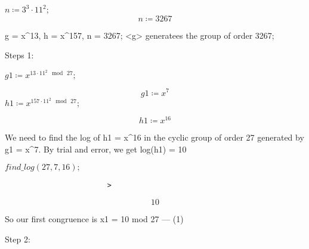 \documentclass[11pt,a4paper,fleqn]{article}
\begin{document}
\begin{enumerate}[1.]
\begin{flushleft}
\begin{enumerate}
\begin{mdframed}
					{$ \displaystyle n \coloneqq 3^{3}\cdot 11^{2}; $}
					{$ \displaystyle \, $}%
					\begin{dmath}\label{(2)}
						n \coloneqq 3267
					\end{dmath}
					\begin{Maple Normal}
						g = x^13, h = x^157, n = 3267; <g> generatees the group of order 3267;


						Steps 1:


					\end{Maple Normal}
					\mapleinput
					{$ \displaystyle \mathit{g1} \coloneqq x^{13\cdot 11^{2}\mod \,27}; $}

					\begin{dmath}\label{(3)}
						\mathit{g1} \coloneqq x^{7}
					\end{dmath}
					\mapleinput
					{$ \displaystyle \mathit{h1} \coloneqq x^{157\cdot 11^{2}\mod \,27}; $}

					\begin{dmath}\label{(4)}
						\mathit{h1} \coloneqq x^{16}
					\end{dmath}
					\begin{Maple Normal}
						We need to find the log of h1 = x^16 in the cyclic group of order 27 generated by g1 = x^7. By trial and error, we get log(h1) = 10
					\end{Maple Normal}
					\begin{Maple Normal}

					\end{Maple Normal}

					{$ \displaystyle \textit{find\_log} (27,7,16); $}\begin{lstlisting}
						>
					\end{lstlisting}
					\begin{dmath}\label{(5)}
						10
					\end{dmath}
					\begin{Maple Normal}
						So our first congruence is x1 = 10 mod 27 --- (1)
					\end{Maple Normal}
					\begin{Maple Normal}

					\end{Maple Normal}
					\begin{Maple Normal}
						Step 2:
					\end{Maple Normal}
					\begin{Maple Normal}


\end{Maple Normal}
\end{mdframed}
\end{enumerate}
\end{flushleft}
\end{enumerate}
\end{document}
